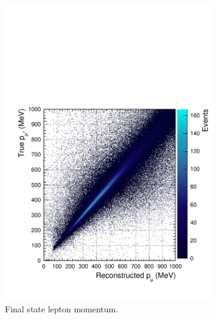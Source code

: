 \begin{figure}
\centering
\begin{subfigure}{.5\textwidth}
  \centering
  \includegraphics[width=0.95\linewidth]{figs/momres2d}
  \caption{Final state lepton momentum.}
  \label{fig:momres2d}
\end{subfigure}%
\begin{subfigure}{.5\textwidth}
  \centering

\end{subfigure}
\end{figure}

